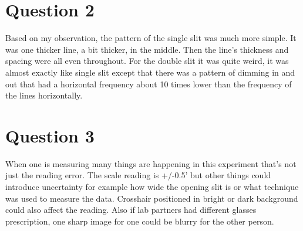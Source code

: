 \documentclass[12pt,letterpaper]{article}
\begin{document}
\section{Question 2}

Based on my observation, the pattern of the single slit was much
more simple. It was one thicker line, a bit thicker, in the middle.
Then the line's thickness and spacing were all even throughout.
For the double slit it was quite weird, it was almost exactly like
single slit except that there was a pattern of dimming in and out
that had a horizontal frequency about 10 times lower than the frequency
of the lines horizontally.

\section{Question 3}

When one is measuring many things are happening in this experiment that's
not just the reading error. The scale reading is +/-0.5' but other things
could introduce uncertainty for example how wide the opening slit is or what
technique was used to measure the data. Crosshair positioned in bright
or dark background could also affect the reading. Also if lab partners
had different glasses prescription, one sharp image for one could be blurry
for the other person.
\end{document}
